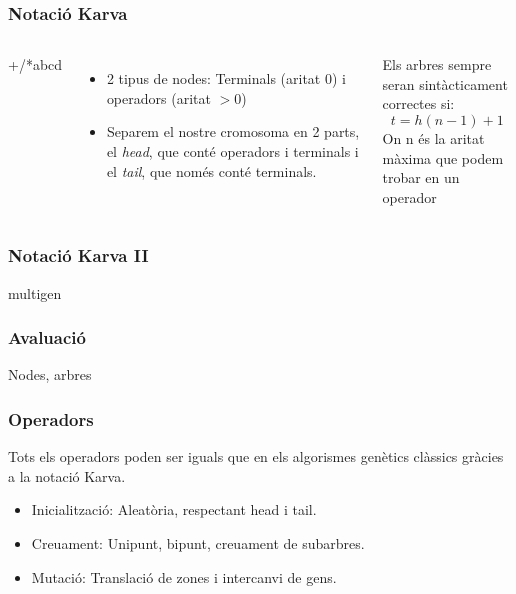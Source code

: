 \documentclass{beamer}
\begin{document}
\begin{frame}
	\frametitle{Notació Karva}
	\begin{columns}[c]
		+/*abcd


		\begin{itemize}
			\item 2 tipus de nodes: Terminals (aritat 0) i operadors (aritat
			$>0$)
			\item Separem el nostre cromosoma en 2 parts, el \emph{head}, que
			conté operadors i terminals i el \emph{tail}, que només conté
			terminals.
		\end{itemize}
		\begin{block}{Els arbres sempre seran sintàcticament correctes si:}
			$$ t =  h (n-1) + 1 $$
			On n és la aritat màxima que podem trobar en un operador
		\end{block}
	\end{columns}
\end{frame}

\begin{frame}
	\frametitle{Notació Karva II}
	multigen
\end{frame}

\begin{frame}
	\frametitle{Avaluació}
	Nodes, arbres
\end{frame}

\begin{frame}
	\frametitle{Operadors}
	Tots els operadors poden ser iguals que en els algorismes genètics clàssics
	gràcies a la notació Karva.
	\pause
	\begin{itemize}
		\item Inicialització: Aleatòria, respectant head i tail.
		\item Creuament: Unipunt, bipunt, creuament de subarbres.
		\item Mutació: Translació de zones i intercanvi de gens.
	\end{itemize}
\end{frame}
\end{document}
